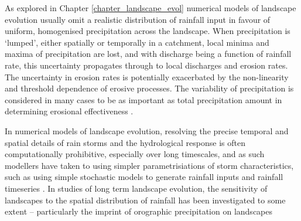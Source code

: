
As explored in Chapter \ref{chapter_landscape_evol} numerical models of landscape evolution usually omit a realistic distribution of rainfall input in favour of uniform, homogenised precipitation across the landscape. When precipitation is `lumped', either spatially or temporally in a catchment, local minima and maxima of precipitation are lost, and with discharge being a function of rainfall rate, this uncertainty propagates through to local discharges and erosion rates. The uncertainty in erosion rates is potentially exacerbated by the non-linearity and threshold dependence of erosive processes. The variability of precipitation is considered in many cases to be as important as total precipitation amount in determining erosional effectiveness \citep{Tucker2000,Tucker2010}.

In numerical models of landscape evolution, resolving the precise temporal and spatial details of rain storms and the hydrological response is often computationally prohibitive, especially over long timescales, and as such modellers have taken to using simpler parametrisiations of storm characteristics, such as using simple stochastic models to generate rainfall inputs and rainfall timeseries \citep{Eagleson1978,Tucker2001}. In studies of long term landscape evolution, the sensitivity of landscapes to the spatial distribution of rainfall has been investigated to some extent -- particularly the imprint of orographic precipitation on landscapes \citep[e.g][]{Roe2002,Anders2008,Han2014}

